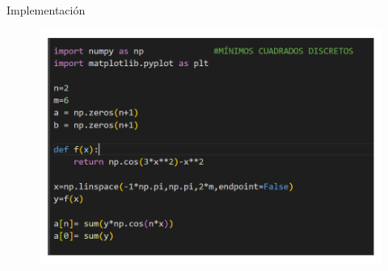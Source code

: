 \begin{frame}{Implementación}
    \begin{figure}
        \centering
        \includegraphics[width=.5\paperwidth]{p7-code1.png}
        \caption{}
        \label{fig:enter-label}
    \end{figure}
\end{frame}

